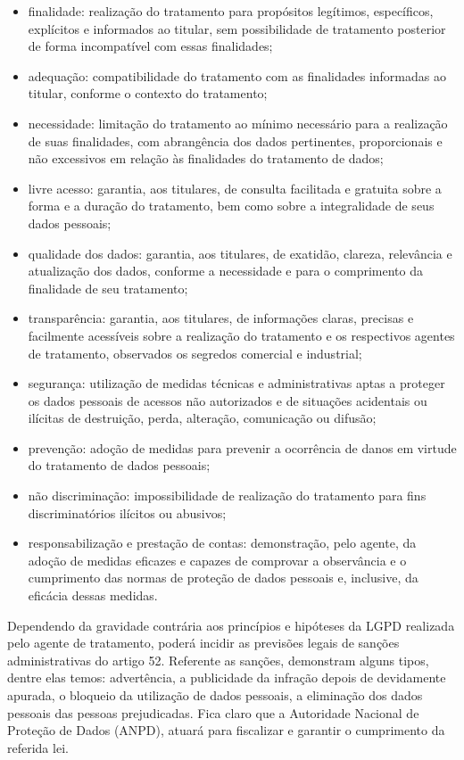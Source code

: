 \documentclass[
	12pt,				%
	openright,			%
	oneside,			%
	a4paper,			%
	english,			%
	french,				%
	spanish,			%
	brazil,				%
	]{abntex2}
\begin{document}
\begin{itemize}
\item finalidade: realização do tratamento para propósitos legítimos, específicos, explícitos e informados ao titular, sem possibilidade de tratamento posterior de forma incompatível com essas finalidades;
\item adequação: compatibilidade do tratamento com as finalidades informadas ao titular, conforme o contexto do tratamento;
\item necessidade: limitação do tratamento ao mínimo necessário para a realização de suas finalidades, com abrangência dos dados pertinentes, proporcionais e não excessivos em relação às finalidades do tratamento de dados;
\item livre acesso: garantia, aos titulares, de consulta facilitada e gratuita sobre a forma e a duração do tratamento, bem como sobre a integralidade de seus dados pessoais;
\item qualidade dos dados: garantia, aos titulares, de exatidão, clareza, relevância e atualização dos dados, conforme a necessidade e para o comprimento da finalidade de seu tratamento;
\item transparência: garantia, aos titulares, de informações claras, precisas e facilmente acessíveis sobre a realização do tratamento e os respectivos agentes de tratamento, observados os segredos comercial e industrial;
\item segurança: utilização de medidas técnicas e administrativas aptas a proteger os dados pessoais de acessos não autorizados e de situações acidentais ou ilícitas de destruição, perda, alteração, comunicação ou difusão;
\item prevenção: adoção de medidas para prevenir a ocorrência de danos em virtude do tratamento de dados pessoais;
\item não discriminação: impossibilidade de realização do tratamento para fins discriminatórios ilícitos ou abusivos; 
\item responsabilização e prestação de contas: demonstração, pelo agente, da adoção de medidas eficazes e capazes de comprovar a observância e o cumprimento das normas de proteção de dados pessoais e, inclusive, da eficácia dessas medidas.
\end{itemize}

Dependendo da gravidade contrária aos princípios e hipóteses da LGPD realizada pelo agente de tratamento, poderá incidir as previsões legais de sanções administrativas do artigo 52. Referente as sanções, \cite{Alves2020} demonstram alguns tipos, dentre elas temos: advertência, a publicidade da infração depois de devidamente apurada, o bloqueio da utilização de dados pessoais, a eliminação dos dados pessoais das pessoas prejudicadas. Fica claro que a Autoridade Nacional de Proteção de Dados (ANPD), atuará para fiscalizar e garantir o cumprimento da referida lei.
\end{document}
